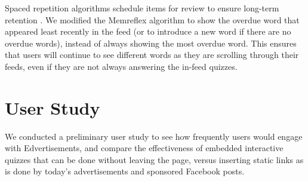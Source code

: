 \documentclass{sigchi}
\begin{document}
Spaced repetition algorithms schedule items for review to ensure long-term retention \cite{karpicke2011spaced}. We modified the Memreflex algorithm \cite{memreflex} to show the overdue word that appeared least recently in the feed (or to introduce a new word if there are no overdue words), instead of always showing the most overdue word. %
This ensures that users will continue to see different words as they are scrolling through their feeds, even if they are not always answering the in-feed quizzes.





\section{User Study}

We conducted a preliminary user study to see how frequently users would engage with Edvertisements, and compare the effectiveness of embedded interactive quizzes that can be done without leaving the page, versus inserting static links as is done by today's advertisements and sponsored Facebook posts. %
\end{document}
